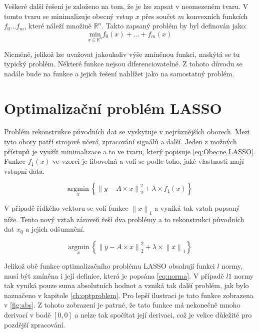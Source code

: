\documentclass[FM,BP]{tulthesis}
\newcounter{Vzorce}
\begin{document}
Veškeré další řešení je založeno na tom, že je lze zapsat v neomezeném tvaru. V tomto tvaru se minimalizuje obecný vstup $x$ přes součet $m$ konvexních funkcích $f_0 \ldots f_m$, které náleží množině $\mathbb{R}^n$. Takto zapsaný problém by byl definován jako:
\begin{equation} \label{eq:Obecny problem} \tag{Vzorec \theVzorce}
\underset{x \in \mathbb{R}^n} {\mathrm{min}} f_{0}(x)+\ldots+f_{m}(x)
\end{equation}

Nicméně, jelikož lze uvažovat jakoukoliv výše zmíněnou funkci, naskýtá se tu typický problém. Některé funkce nejsou diferenciovatelné. Z tohoto důvodu se nadále bude na funkce a jejich řešení nahlížet jako na samostatný problém.

\section{Optimalizační problém LASSO}
Problém rekonstrukce původních dat se vyskytuje v nejrůznějších oborech. Mezi tyto obory patří strojové učení, zpracování signálů a další. Jeden z možných přístupů je využít minimalizace a to ve tvaru, který popisuje \ref{eq:Obecne LASSO}. Funkce $f_1(x)$ ve vzorci je libovolná a volí se podle toho, jaké vlastnosti mají vstupní data. 

\begin{equation} \label{eq:Obecne LASSO} \tag{Vzorec \theVzorce}
\underset{x} {\mathrm{argmin}} ~\left\{\left\|y-A \times x\right\| ^2 _2+ \lambda \times f_1(x)\right\}
\end{equation}

V případě řídkého vektoru se volí funkce $\left\|x\right\|_1$ a vyniká tak vztah popsaný níže. Tento nový vztah zároveň řeší dva problémy a to rekonstrukci původních dat $x_0$ a jejich odšumnění.

\begin{equation} \label{eq:Konkretni LASSO} \tag{Vzorec \theVzorce}
\underset{x} {\mathrm{argmin}} ~\left\{\left\|y-A \times x\right\| ^2 _2+ \lambda \times \left\|x\right\|_1\right\}
\end{equation}

Jelikož obě funkce optimalizačního problému LASSO obsahují funkci $l$ normy, musí být zmíněna i její definice, která je popsána \ref{eq:norma}. V případě $l1$ normy tak vyniká pouze suma absolutních hodnot a vzniká tak další problém, jak bylo naznačeno v kapitole \ref{ch:optproblem}. Pro lepší ilustraci je tato funkce zobrazena v \ref{fig:abs}. Z tohoto zobrazení je patrné, že tato funkce má nekonečně mnoho derivací v bodě $[0,0]$ a nelze tak spočítat její derivaci, což je velice důležité pro pozdější zpracování.
\end{document}
